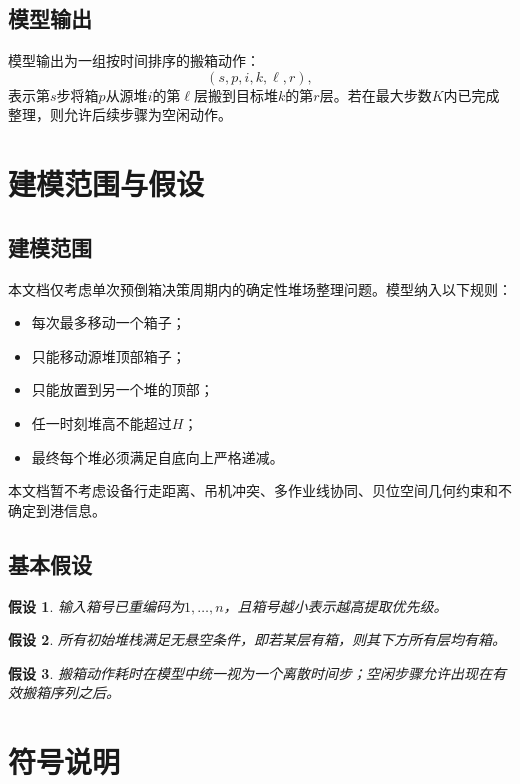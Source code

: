 \documentclass[11pt,a4paper]{ctexart}
\newtheorem{assumption}{假设}[section]
\begin{document}
\subsection{模型输出}
模型输出为一组按时间排序的搬箱动作：
\[
(s,p,i,k,\ell,r),
\]
表示第$s$步将箱$p$从源堆$i$的第$\ell$层搬到目标堆$k$的第$r$层。若在最大步数$K$内已完成整理，则允许后续步骤为空闲动作。

\section{建模范围与假设}

\subsection{建模范围}
本文档仅考虑单次预倒箱决策周期内的确定性堆场整理问题。模型纳入以下规则：
\begin{itemize}
    \item 每次最多移动一个箱子；
    \item 只能移动源堆顶部箱子；
    \item 只能放置到另一个堆的顶部；
    \item 任一时刻堆高不能超过$H$；
    \item 最终每个堆必须满足自底向上严格递减。
\end{itemize}

本文档暂不考虑设备行走距离、吊机冲突、多作业线协同、贝位空间几何约束和不确定到港信息。

\subsection{基本假设}
\begin{assumption}
输入箱号已重编码为$1,\ldots,n$，且箱号越小表示越高提取优先级。
\end{assumption}

\begin{assumption}
所有初始堆栈满足无悬空条件，即若某层有箱，则其下方所有层均有箱。
\end{assumption}

\begin{assumption}
搬箱动作耗时在模型中统一视为一个离散时间步；空闲步骤允许出现在有效搬箱序列之后。
\end{assumption}

\section{符号说明}
\end{document}
